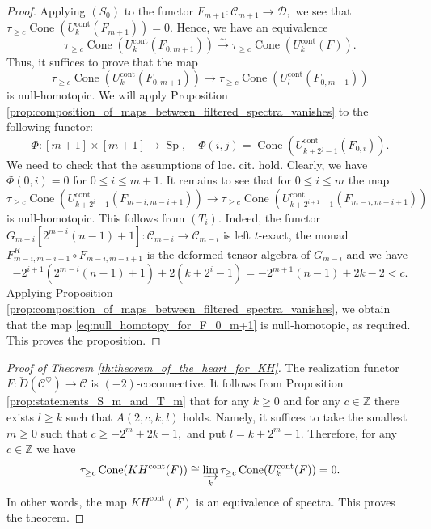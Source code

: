 \documentclass[11pt,leqno]{amsart}
\numberwithin{equation}{section}
\def\Z{\mathbb{Z}}
\newcommand{\indlim}[1][]{\mathop{\varinjlim}\limits_{#1}}
\newcommand{\xto}{\xrightarrow}
\newcommand{\Cone}{\operatorname{Cone}}
\newcommand{\cont}{\operatorname{cont}}
\newcommand{\cD}{{\mathcal D}}
\newcommand{\cC}{{\mathcal C}}
\newcommand{\Sp}{\operatorname{Sp}}
\begin{document}
\begin{proof}
Applying $(S_0)$ to the functor $F_{m+1}:\cC_{m+1}\to\cD,$ we see that $\tau_{\geq c}\Cone(U_k^{\cont}(F_{m+1}))=0.$ Hence, we have an equivalence
\begin{equation*}
\tau_{\geq c}\Cone(U_k^{\cont}(F_{0,m+1}))\xto{\sim} \tau_{\geq c}\Cone(U_k^{\cont}(F)).
\end{equation*}
Thus, it suffices to prove that the map
\begin{equation}\label{eq:null_homotopy_for_F_0_m+1}
\tau_{\geq c} \Cone(U_k^{\cont}(F_{0,m+1}))\to \tau_{\geq c}\Cone(U_l^{\cont}(F_{0,m+1}))
\end{equation}
is null-homotopic. We will apply Proposition \ref{prop:composition_of_maps_between_filtered_spectra_vanishes} to the following functor:
\begin{equation*}
\Phi:[m+1]\times [m+1]\to \Sp,\quad \Phi(i,j)=\Cone(U_{k+2^j-1}^{\cont}(F_{0,i})).
\end{equation*}
We need to check that the assumptions of loc. cit. hold. Clearly, we have $\Phi(0,i)=0$ for $0\leq i\leq m+1.$ It remains to see that for $0\leq i\leq m$ the map 
\begin{equation*}
\tau_{\geq c} \Cone(U_{k+2^i-1}^{\cont}(F_{m-i,m-i+1}))\to \tau_{\geq c}\Cone(U_{k+2^{i+1}-1}^{\cont}(F_{m-i,m-i+1}))
\end{equation*}
is null-homotopic. This follows from $(T_i).$ Indeed, the functor $G_{m-i}[2^{m-i}(n-1)+1]:\cC_{m-i}\to\cC_{m-i}$ is left $t$-exact, the monad $F_{m-i,m-i+1}^R\circ F_{m-i,m-i+1}$ is the deformed tensor algebra of $G_{m-i}$ and we have
\begin{equation*}
-2^{i+1}(2^{m-i}(n-1)+1)+2(k+2^i-1)=-2^{m+1}(n-1)+2k-2<c.
\end{equation*}
Applying Proposition \ref{prop:composition_of_maps_between_filtered_spectra_vanishes}, we obtain that the map \eqref{eq:null_homotopy_for_F_0_m+1} is null-homotopic, as required. This proves the proposition.
\end{proof}

\begin{proof}[Proof of Theorem \ref{th:theorem_of_the_heart_for_KH}]
The realization functor $F:\check{D}(\cC^{\heartsuit})\to\cC$ is $(-2)$-coconnective. It follows from Proposition \ref{prop:statements_S_m_and_T_m} that for any $k\geq 0$ and for any $c\in\Z$ there exists $l\geq k$ such that $A(2,c,k,l)$ holds. Namely, it suffices to take the smallest $m\geq 0$ such that $c\geq -2^m+2k-1,$ and put $l=k+2^m-1.$ Therefore, for any $c\in\Z$ we have
\begin{equation*}
\tau_{\geq c}\Cone(KH^{\cont}(F))\cong \indlim[k]\tau_{\geq c}\Cone(U_k^{\cont}(F))=0.
\end{equation*}
In other words, the map $KH^{\cont}(F)$ is an equivalence of spectra. This proves the theorem.
\end{proof}
\end{document}
